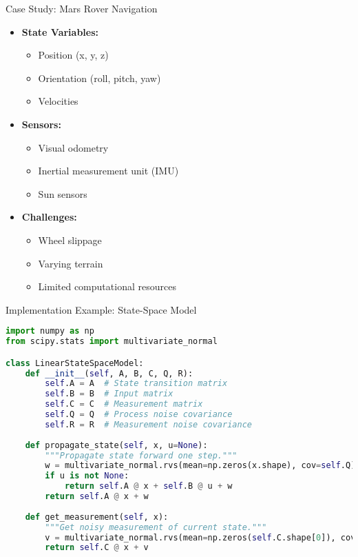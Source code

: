 \documentclass[aspectratio=169]{beamer}
\begin{document}
\begin{frame}{Case Study: Mars Rover Navigation}
    \begin{itemize}
        \item<1-> \textbf{State Variables:}
            \begin{itemize}
                \item Position (x, y, z)
                \item Orientation (roll, pitch, yaw)
                \item Velocities
            \end{itemize}
        \item<2-> \textbf{Sensors:}
            \begin{itemize}
                \item Visual odometry
                \item Inertial measurement unit (IMU)
                \item Sun sensors
            \end{itemize}
        \item<3-> \textbf{Challenges:}
            \begin{itemize}
                \item Wheel slippage
                \item Varying terrain
                \item Limited computational resources
            \end{itemize}
    \end{itemize}
\end{frame}

\begin{frame}[fragile]{Implementation Example: State-Space Model}
\begin{lstlisting}[language=Python]
import numpy as np
from scipy.stats import multivariate_normal

class LinearStateSpaceModel:
    def __init__(self, A, B, C, Q, R):
        self.A = A  # State transition matrix
        self.B = B  # Input matrix
        self.C = C  # Measurement matrix
        self.Q = Q  # Process noise covariance
        self.R = R  # Measurement noise covariance
        
    def propagate_state(self, x, u=None):
        """Propagate state forward one step."""
        w = multivariate_normal.rvs(mean=np.zeros(x.shape), cov=self.Q)
        if u is not None:
            return self.A @ x + self.B @ u + w
        return self.A @ x + w
    
    def get_measurement(self, x):
        """Get noisy measurement of current state."""
        v = multivariate_normal.rvs(mean=np.zeros(self.C.shape[0]), cov=self.R)
        return self.C @ x + v
\end{lstlisting}
\end{frame}
\end{document}
